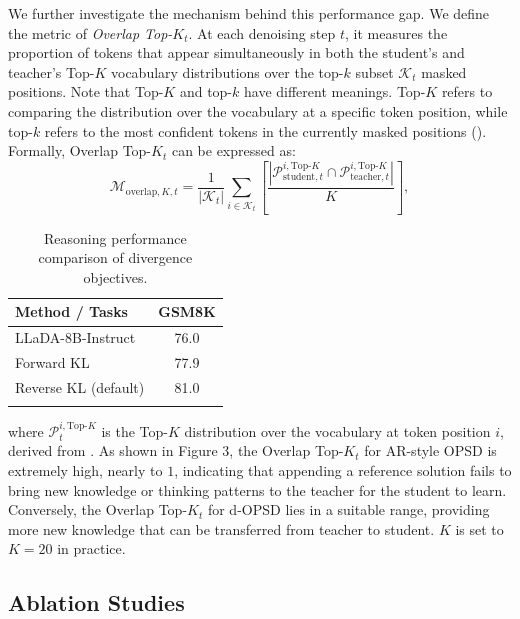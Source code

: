 \documentclass{article}
\begin{document}
We further investigate the mechanism behind this performance gap. We define the metric of \textit{Overlap Top-$K_t$}. At each denoising step $t$, it measures the proportion of tokens that appear simultaneously in both the student’s and teacher’s Top-$K$ vocabulary distributions over the top-$k$ subset $\mathcal{K}_t$ masked positions. Note that Top-$K$ and top-$k$ have different meanings. Top-$K$ refers to comparing the distribution over the vocabulary at a specific token position, while top-$k$ refers to the most confident tokens in the currently masked positions (). Formally, Overlap Top-$K_t$ can be expressed as:
\begin{equation}
    \mathcal{M}_{\text{overlap}, K, t} =  \frac{1}{|\mathcal{K}_t|}  \sum_{i \in \mathcal{K}_t} \left[ \frac{|\mathcal{P}_{\text{student}, t}^{i,\text{Top-}K} \cap \mathcal{P}_{\text{teacher}, t}^{i, \text{Top-}K}|}{K}   \right],
\end{equation}

\begin{table}
\vspace{-20pt}
\setlength{\tabcolsep}{4pt}
\centering
\caption{Reasoning performance comparison of divergence objectives.}
\begin{tabular}{lc}
\toprule
\textbf{Method / Tasks} & \textbf{GSM8K} \\
\midrule
LLaDA-8B-Instruct & 76.0 \\
Forward KL & 77.9 \\
Reverse KL (default) & \cellcolor{lightblue} 81.0 \\
\bottomrule
\label{tab5}
\end{tabular}
\vspace{-20pt}
\end{table}

where $\mathcal{P}_{t}^{i,\text{Top-}K}$ is the Top-$K$ distribution over the vocabulary at token position $i$, derived from . As shown in Figure 3, the Overlap Top-$K_t$ for AR-style OPSD is extremely high, nearly to $1$, indicating that appending a reference solution fails to bring new knowledge or thinking patterns to the teacher for the student to learn. Conversely, the Overlap Top-$K_t$ for d-OPSD lies in a suitable range, providing more new knowledge that can be transferred from teacher to student. $K$ is set to $K=20$ in practice.


\subsection{Ablation Studies} \label{sec4.4}
\end{document}
